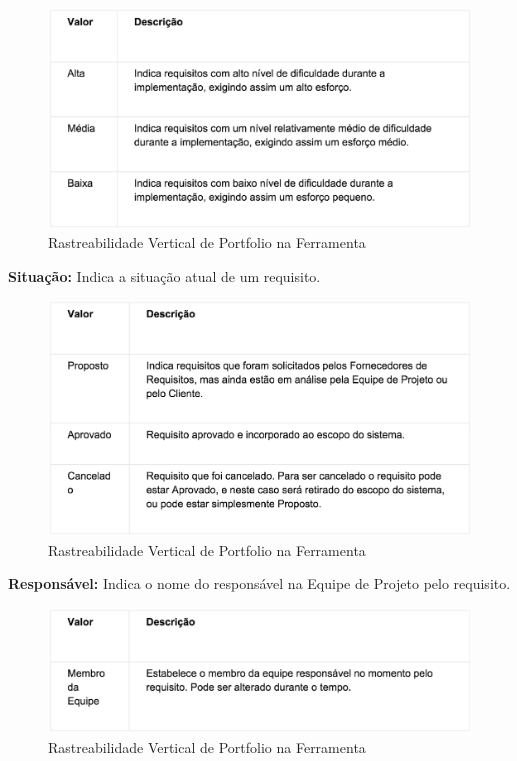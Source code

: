 \begin{figure}[H]
    \centering
	\includegraphics[keepaspectratio=true,scale=0.7]{figuras/atr3.eps}
    \caption{ Rastreabilidade Vertical de Portfolio na Ferramenta}
    \label{fig:ras}
\end{figure}

\textbf{Situação:} Indica a situação atual de um requisito.

\begin{figure}[H]
    \centering
	\includegraphics[keepaspectratio=true,scale=0.7]{figuras/atr4.eps}
    \caption{ Rastreabilidade Vertical de Portfolio na Ferramenta}
    \label{fig:ras}
\end{figure}

\textbf{Responsável:} Indica o nome do responsável na Equipe de Projeto pelo requisito.

\begin{figure}[H]
    \centering
	\includegraphics[keepaspectratio=true,scale=0.7]{figuras/atr5.eps}
    \caption{ Rastreabilidade Vertical de Portfolio na Ferramenta}
    \label{fig:ras}
\end{figure}


